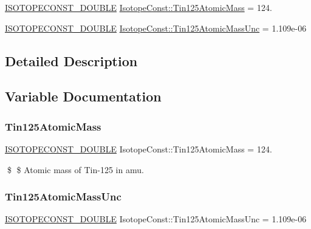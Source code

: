 \begin{DoxyCompactItemize}
\item 
\mbox{\hyperlink{group___isotope_const-_macros_ga8f45a7272ce02c0b4c65c44636ed719a}{I\+S\+O\+T\+O\+P\+E\+C\+O\+N\+S\+T\+\_\+\+D\+O\+U\+B\+LE}} \mbox{\hyperlink{group___isotope_const-_tin-_sn125_gae4bb57b4c63bb14f8940c90393f854a5}{Isotope\+Const\+::\+Tin125\+Atomic\+Mass}} = 124.
\item 
\mbox{\hyperlink{group___isotope_const-_macros_ga8f45a7272ce02c0b4c65c44636ed719a}{I\+S\+O\+T\+O\+P\+E\+C\+O\+N\+S\+T\+\_\+\+D\+O\+U\+B\+LE}} \mbox{\hyperlink{group___isotope_const-_tin-_sn125_ga60995fec3cdfd564aee35b38c8715dca}{Isotope\+Const\+::\+Tin125\+Atomic\+Mass\+Unc}} = 1.\+109e-\/06
\end{DoxyCompactItemize}


\subsection{Detailed Description}


\subsection{Variable Documentation}
\mbox{\label{group___isotope_const-_tin-_sn125_gae4bb57b4c63bb14f8940c90393f854a5}} 
\subsubsection{\texorpdfstring{Tin125\+Atomic\+Mass}{Tin125AtomicMass}}
{\footnotesize\ttfamily \mbox{\hyperlink{group___isotope_const-_macros_ga8f45a7272ce02c0b4c65c44636ed719a}{I\+S\+O\+T\+O\+P\+E\+C\+O\+N\+S\+T\+\_\+\+D\+O\+U\+B\+LE}} Isotope\+Const\+::\+Tin125\+Atomic\+Mass = 124.}

\$ \$ Atomic mass of Tin-\/125 in amu. \mbox{\label{group___isotope_const-_tin-_sn125_ga60995fec3cdfd564aee35b38c8715dca}} 
\subsubsection{\texorpdfstring{Tin125\+Atomic\+Mass\+Unc}{Tin125AtomicMassUnc}}
{\footnotesize\ttfamily \mbox{\hyperlink{group___isotope_const-_macros_ga8f45a7272ce02c0b4c65c44636ed719a}{I\+S\+O\+T\+O\+P\+E\+C\+O\+N\+S\+T\+\_\+\+D\+O\+U\+B\+LE}} Isotope\+Const\+::\+Tin125\+Atomic\+Mass\+Unc = 1.\+109e-\/06}

